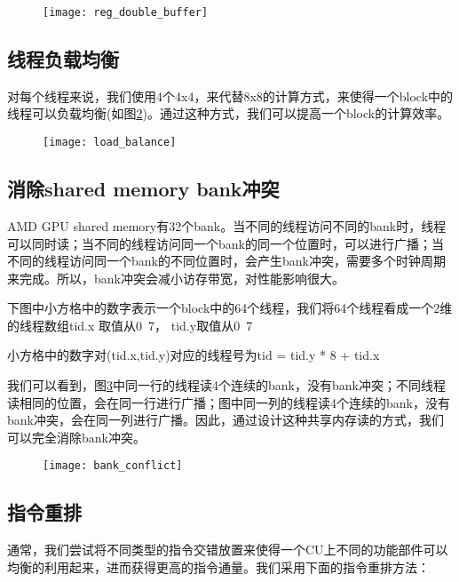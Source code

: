 \begin{figure}[htbp]
	\centering
	\texttt{[image: reg\_double\_buffer]}
	\label{fig:reg_double_buffer}
\end{figure}

\subsection{线程负载均衡}
对每个线程来说，我们使用4个4x4，来代替8x8的计算方式，来使得一个block中的线程可以负载均衡(如图\ref{fig:load_balance})。通过这种方式，我们可以提高一个block的计算效率。
\begin{figure}[htbp]
	\centering
	\texttt{[image: load\_balance]}
	\label{fig:load_balance}
\end{figure}


\subsection{消除shared memory bank冲突}
AMD GPU shared memory有32个bank。当不同的线程访问不同的bank时，线程可以同时读；当不同的线程访问同一个bank的同一个位置时，可以进行广播；当不同的线程访问同一个bank的不同位置时，会产生bank冲突，需要多个时钟周期来完成。所以，bank冲突会减小访存带宽，对性能影响很大。

下图中小方格中的数字表示一个block中的64个线程，我们将64个线程看成一个2维的线程数组tid.x 取值从0~7， tid.y取值从0~7

小方格中的数字对(tid.x,tid.y)对应的线程号为tid = tid.y * 8 + tid.x

我们可以看到，图\ref{fig:bank_conflict}中同一行的线程读4个连续的bank，没有bank冲突；不同线程读相同的位置，会在同一行进行广播；图中同一列的线程读4个连续的bank，没有bank冲突，会在同一列进行广播。因此，通过设计这种共享内存读的方式，我们可以完全消除bank冲突。
\begin{figure}[htbp]
	\centering
	\texttt{[image: bank\_conflict]}
	\label{fig:bank_conflict}
\end{figure}


\subsection{指令重排}
通常，我们尝试将不同类型的指令交错放置来使得一个CU上不同的功能部件可以均衡的利用起来，进而获得更高的指令通量。我们采用下面的指令重排方法：

